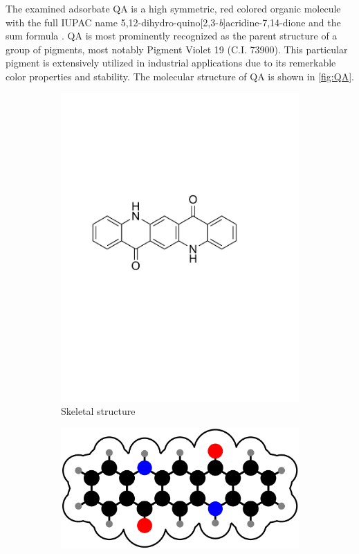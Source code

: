 The examined adsorbate \acf{QA} is a high symmetric, red colored organic molecule with the full IUPAC name 5,12-dihydro-quino[2,3-\textit{b}]acridine-7,14-dione and the sum formula .
\ac{QA} is most prominently recognized as the parent structure of a group of pigments, most notably Pigment Violet 19 (C.I. 73900). This particular pigment is extensively utilized in industrial applications due to its remerkable color properties and stability.\autocite{ChemBook2025,ChemSpider2025} The molecular structure of \ac{QA} is shown in \autoref{fig:QA}.

\begin{figure}[H]
	\centering
	\begin{subfigure}[b]{0.48\linewidth}
		\centering
		\includegraphics[width=\linewidth]{images/QA.pdf}
		\caption{Skeletal structure}
	\end{subfigure}
	\hfill
	\begin{subfigure}[b]{0.48\linewidth}
		\centering
		\includegraphics[width=\linewidth]{images/QA_molecule.png}

\end{subfigure}
\end{figure}
